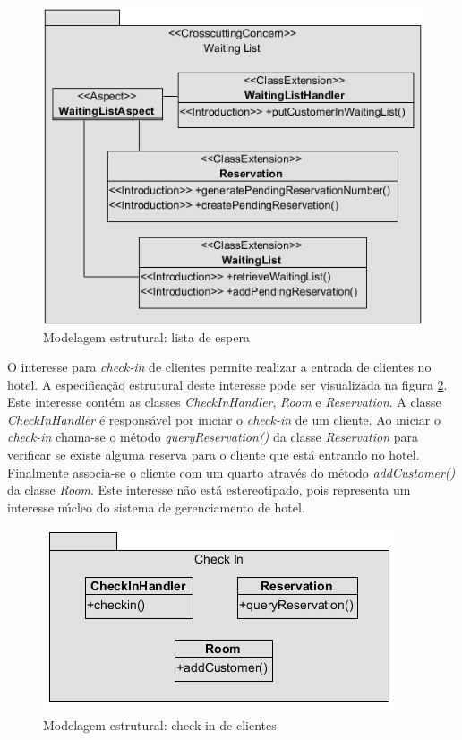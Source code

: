   \begin{figure}[!h]
	\centering
	\includegraphics{img/case_study_structural_waiting_list.png}
	\caption{Modelagem estrutural: lista de espera}\label{fig:case_study_structural_waiting_list}
  \end{figure}
  
O interesse para \textit{check-in} de clientes permite realizar a entrada de clientes no hotel. A especificação estrutural deste interesse pode ser
visualizada na figura \ref{fig:case_study_structural_check_in}. Este interesse contém as classes \textit{CheckInHandler}, \textit{Room} e
\textit{Reservation}. A classe \textit{CheckInHandler} é responsável por iniciar o \textit{check-in} de um cliente. Ao iniciar o \textit{check-in}
chama-se o método \textit{queryReservation()} da classe \textit{Reservation} para verificar se existe alguma reserva para o cliente que está entrando
no hotel. Finalmente associa-se o cliente com um quarto através do método \textit{addCustomer()} da classe \textit{Room}. Este interesse não está
estereotipado, pois representa um interesse núcleo do sistema de gerenciamento de hotel.

  \begin{figure}[!h]
	\centering
	\includegraphics{img/case_study_structural_check_in.png}
	\caption{Modelagem estrutural: check-in de clientes}\label{fig:case_study_structural_check_in}
  \end{figure}

